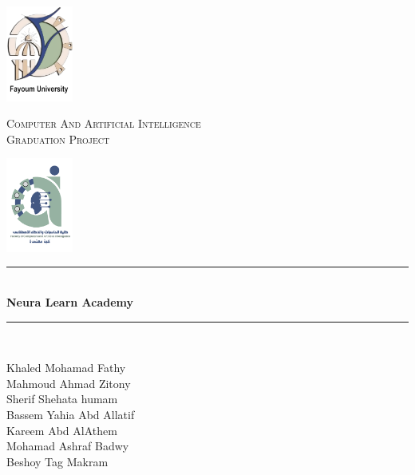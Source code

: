 \begin{titlepage} 
	\newcommand{\HRule}{\rule{\linewidth}{0.5mm}} %
	
	\begin{center}
		\begin{minipage}{0.15\textwidth}%
			\includegraphics[width=2.2cm]{content/Logo copy.png}
		\end{minipage}
		\begin{minipage}{0.69\textwidth}%
			\center
			\textsc{\large  Computer And Artificial Intelligence}\\[0.5cm]
			\textsc{\normalsize Graduation Project}\\[0.5cm]
		\end{minipage}\hfill
		\begin{minipage}{0.15\textwidth}%
			\includegraphics[width=2.2cm]{content/faculty.png}
        \end{minipage}
	\end{center}

	\center %
	
	\vspace{3cm}
	\HRule\\[0.4cm]
	
	{\huge\bfseries Neura Learn Academy}\\[0.4cm] %
	
	\HRule\\[1.5cm]
	
	\begin{spacing}{1}
		\begin{center}
			\large
			Khaled Mohamad Fathy \\
			Mahmoud Ahmad Zitony\\ 
			Sherif Shehata humam\\
			Bassem Yahia Abd Allatif\\
			Kareem Abd AlAthem\\ 
			Mohamad Ashraf Badwy \\
			Beshoy Tag Makram
			\vspace{50mm}
		\end{center}
	\end{spacing}


\end{titlepage}
